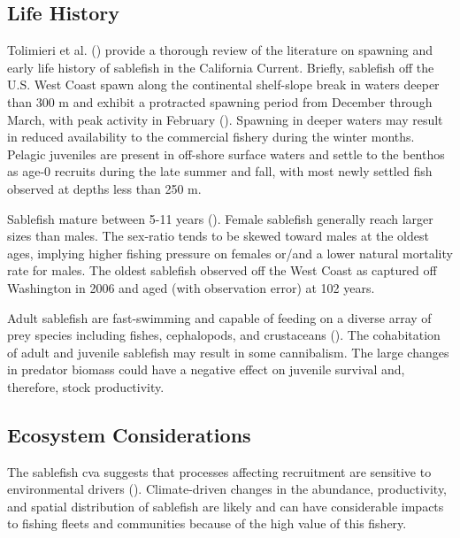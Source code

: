 \documentclass[
  english,
]{article}
\begin{document}
\subsection{Life History}\label{life-history}

Tolimieri et al. ()
provide a thorough review of the literature on spawning and early life
history of sablefish in the California Current. Briefly, sablefish off
the U.S. West Coast spawn along the continental shelf-slope break in
waters deeper than 300 m and exhibit a protracted spawning period from
December through March, with peak activity in February
(). Spawning
in deeper waters may result in reduced availability to the commercial
fishery during the winter months. Pelagic juveniles are present in
off-shore surface waters and settle to the benthos as age-0 recruits
during the late summer and fall, with most newly settled fish observed
at depths less than 250 m.

Sablefish mature between 5-11 years
(). Female sablefish
generally reach larger sizes than males. The sex-ratio tends to be
skewed toward males at the oldest ages, implying higher fishing pressure
on females or/and a lower natural mortality rate for males. The oldest
sablefish observed off the West Coast as captured off Washington in 2006
and aged (with observation error) at 102 years.

Adult sablefish are fast-swimming and capable of feeding on a diverse
array of prey species including fishes, cephalopods, and crustaceans
(). The cohabitation
of adult and juvenile sablefish may result in some cannibalism. The
large changes in predator biomass could have a negative effect on
juvenile survival and, therefore, stock productivity.

\subsection{Ecosystem Considerations}\label{ecosystem-considerations}

The sablefish \gls{cva} suggests that processes affecting recruitment
are sensitive to environmental drivers
().
Climate-driven changes in the abundance, productivity, and spatial
distribution of sablefish are likely and can have considerable impacts
to fishing fleets and communities because of the high value of this
fishery.
\end{document}
